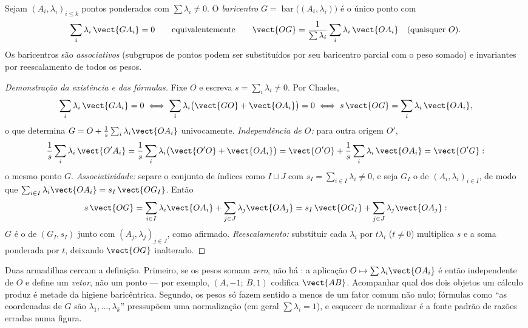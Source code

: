 \begin{definition}[Baricentro]\label{def:b2:affine:barycenter}
Sejam $(A_i, \lambda_i)_{i \leq k}$ pontos ponderados com
$\sum\lambda_i \neq 0$. O \emph{baricentro} $G
= \operatorname{bar}\bigl((A_i, \lambda_i)\bigr)$ é o único
ponto com
\[
\sum_i \lambda_i\, \vect{GA_i} = 0
\qquad\text{equivalentemente}\qquad
\vect{OG} = \frac{1}{\sum\lambda_i}\sum_i \lambda_i\,\vect{OA_i}
\quad (\text{quaisquer } O).
\]
Os baricentros são \emph{associativos} (subgrupos de pontos podem ser
substituídos por seu baricentro parcial com o peso somado) e
invariantes por reescalamento de todos os pesos.
\end{definition}

\begin{proof}[Demonstração da existência e das fórmulas]
Fixe $O$ e escreva $s = \sum_i\lambda_i \neq 0$. Por Chasles,
\[
\sum_i\lambda_i\,\vect{GA_i} = 0
\iff \sum_i\lambda_i\bigl(\vect{GO} + \vect{OA_i}\bigr) = 0
\iff s\,\vect{OG} = \sum_i\lambda_i\,\vect{OA_i},
\]
o que determina $G = O + \frac1s\sum_i\lambda_i\vect{OA_i}$
univocamente. \emph{Independência de $O$:} para outra origem
$O'$,
\[
\frac1s\sum_i\lambda_i\,\vect{O'A_i}
= \frac1s\sum_i\lambda_i\bigl(\vect{O'O} + \vect{OA_i}\bigr)
= \vect{O'O} + \frac1s\sum_i\lambda_i\,\vect{OA_i}
= \vect{O'G} :
\]
o mesmo ponto $G$. \emph{Associatividade:} separe o conjunto de índices
como $I \sqcup J$ com $s_I = \sum_{i\in I}\lambda_i \neq 0$,
e seja $G_I$ o  de $(A_i, \lambda_i)_{i\in
I}$, de modo que $\sum_{i\in I}\lambda_i\vect{OA_i} =
s_I\,\vect{OG_I}$. Então
\[
s\,\vect{OG}
= \sum_{i\in I}\lambda_i\vect{OA_i} +
\sum_{j\in J}\lambda_j\vect{OA_j}
= s_I\,\vect{OG_I} + \sum_{j\in J}\lambda_j\vect{OA_j} :
\]
$G$ é o  de $(G_I, s_I)$ junto com $(A_j,
\lambda_j)_{j\in J}$, como afirmado. \emph{Reescalamento:} substituir
cada $\lambda_i$ por $t\lambda_i$ ($t \neq 0$) multiplica $s$
e a soma ponderada por $t$, deixando $\vect{OG}$ inalterado.
\end{proof}

\begin{remark}
Duas armadilhas cercam a definição. Primeiro, se os pesos somam
\emph{zero}, não há : a aplicação $O \mapsto
\sum\lambda_i\vect{OA_i}$ é então independente de $O$ e
define um \emph{vetor}, não um ponto --- por exemplo,
$(A, -1;\ B, 1)$ codifica $\vect{AB}$. Acompanhar qual
dos dois objetos um cálculo produz é metade da
higiene baricêntrica. Segundo, os pesos só fazem sentido a menos
de um fator comum não nulo; fórmulas como ``as coordenadas
de $G$ são $\lambda_1, \dots, \lambda_k$'' pressupõem uma
normalização (em geral $\sum\lambda_i = 1$), e esquecer
de normalizar é a fonte padrão de razões erradas numa
figura.
\end{remark}


